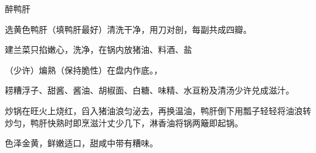 \begin{recipe}{醉鸭肝}

\ingredients


\cooking

\step 选黄色鸭肝（填鸭肝最好）清洗干净，用刀对剖，每副共成四瓣。

\step 建兰菜只掐嫩心，洗净，在锅内放猪油、料酒、盐

（少许）煸熟（保持脆性）在盘内作底。，

\step 耢糟浮子、甜酱、酱油、胡椒面、白糖、味精、水亘粉及清汤少许兑成滋汁。

\step 炒锅在旺火上烧红，舀入猪油浪匀泌去，再换温油，鸭肝倒下用瓢子轻轻将油浪转
炒匀，鸭肝快熟时即烹滋汁丈少几下，淋香油将锅两簸即起锅。

\notes

色泽金黄，鲜嫩适口，甜咸中带有糟味。

\end{recipe}

